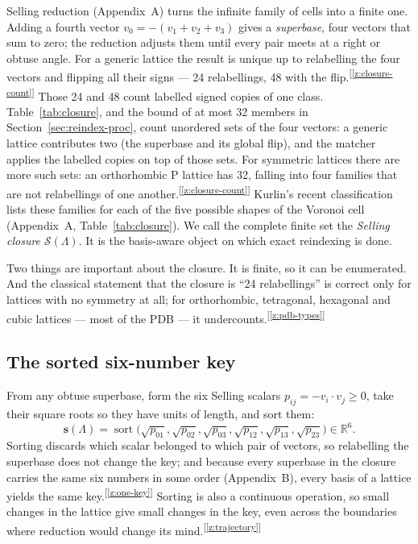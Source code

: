 \documentclass[11pt]{article}
\newcommand{\sortkey}{\mathbf{s}}
\newcommand{\Sclosure}{\mathcal{S}}
\newcommand{\chk}[1]{\textsuperscript{[\ref{#1}]}}
\begin{document}
Selling reduction (Appendix~A) turns the infinite family of cells into a finite one. Adding a fourth vector $v_0=-(v_1+v_2+v_3)$ gives a \emph{superbase}, four vectors that sum to zero; the reduction adjusts them until every pair meets at a right or obtuse angle. For a generic lattice the result is unique up to relabelling the four vectors and flipping all their signs --- 24 relabellings, 48 with the flip.\chk{z:closure-count} Those 24 and 48 count labelled signed copies of one class. Table~\ref{tab:closure}, and the bound of at most 32 members in Section~\ref{sec:reindex-proc}, count unordered sets of the four vectors: a generic lattice contributes two (the superbase and its global flip), and the matcher applies the labelled copies on top of those sets. For symmetric lattices there are more such sets: an orthorhombic P lattice has 32, falling into four families that are not relabellings of one another.\chk{z:closure-count} Kurlin's recent classification lists these families for each of the five possible shapes of the Voronoi cell (Appendix~A, Table~\ref{tab:closure}). We call the complete finite set the \emph{Selling closure} $\Sclosure(\Lambda)$. It is the basis-aware object on which exact reindexing is done.

Two things are important about the closure. It is finite, so it can be enumerated. And the classical statement that the closure is ``24 relabellings'' is correct only for lattices with no symmetry at all; for orthorhombic, tetragonal, hexagonal and cubic lattices --- most of the PDB --- it undercounts.\chk{z:pdb-types}

\subsection{The sorted six-number key}

From any obtuse superbase, form the six Selling scalars $p_{ij}=-v_i\cdot v_j\ge0$, take their square roots so they have units of length, and sort them:
\[
\sortkey(\Lambda)=\operatorname{sort}\big(\sqrt{p_{01}},\sqrt{p_{02}},\sqrt{p_{03}},\sqrt{p_{12}},\sqrt{p_{13}},\sqrt{p_{23}}\big)\in\mathbb R^6 .
\]
Sorting discards which scalar belonged to which pair of vectors, so relabelling the superbase does not change the key; and because every superbase in the closure carries the same six numbers in some order (Appendix~B), every basis of a lattice yields the same key.\chk{z:one-key} Sorting is also a continuous operation, so small changes in the lattice give small changes in the key, even across the boundaries where reduction would change its mind.\chk{z:trajectory}
\end{document}

